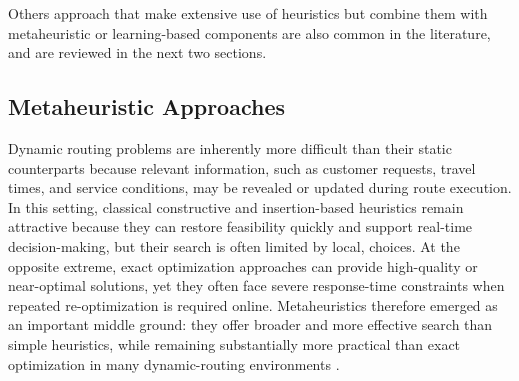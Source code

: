 Others approach that make extensive use of heuristics but combine them with metaheuristic or learning-based components
are also common in the literature, and are reviewed in the next two sections.


\subsection{Metaheuristic Approaches}

Dynamic routing problems are inherently more difficult than their static counterparts because relevant information, 
such as customer requests, travel times, and service conditions, may be revealed or updated during route execution.
In this setting, classical constructive and insertion-based heuristics remain attractive because they can restore 
feasibility quickly and support real-time decision-making\cite{jungDuallySustainableUrban2017}, but their search is often limited by local, choices. 
At the opposite extreme, exact optimization approaches can provide high-quality or near-optimal solutions, 
yet they often face severe response-time constraints when repeated re-optimization is required online.\cite{ozbayginIterativeReoptimizationFramework2019} 
Metaheuristics therefore emerged as an important middle ground: they offer broader and more effective search 
than simple heuristics, while remaining substantially more practical than exact optimization in many dynamic-routing
environments \cite{AntColonySchyns2015,bouziyane2018SolvingDynamicVehicle,cotaIntegratingVehicleScheduling2022}.

